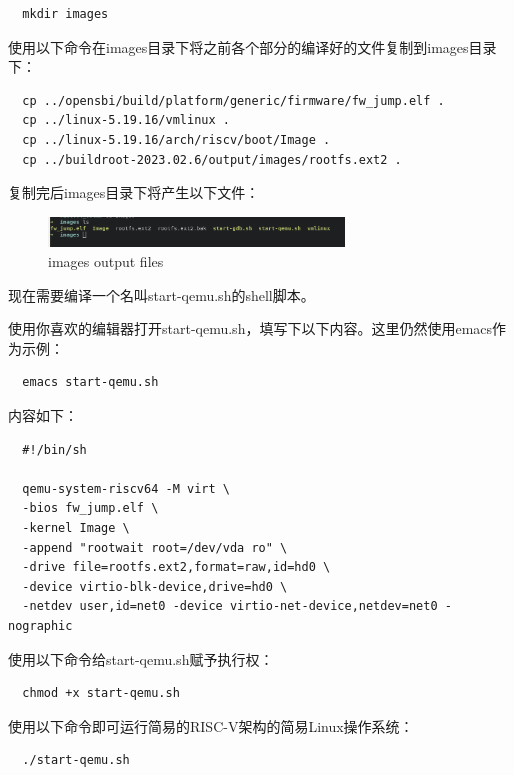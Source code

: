 \documentclass[lang=cn,10pt]{elegantbook}
\begin{document}
\begin{lstlisting}
  mkdir images
\end{lstlisting}

使用以下命令在images目录下将之前各个部分的编译好的文件复制到images目录下：

\begin{lstlisting}
  cp ../opensbi/build/platform/generic/firmware/fw_jump.elf .
  cp ../linux-5.19.16/vmlinux .
  cp ../linux-5.19.16/arch/riscv/boot/Image .
  cp ../buildroot-2023.02.6/output/images/rootfs.ext2 .
\end{lstlisting}

复制完后images目录下将产生以下文件：


\begin{figure}[htbp]
  \centering
  \includegraphics[width=0.7\textwidth]{image/image-20231105102806931.png}
  \caption{images output files}
\end{figure}

现在需要编译一个名叫start-qemu.sh的shell脚本。

使用你喜欢的编辑器打开start-qemu.sh，填写下以下内容。这里仍然使用emacs作为示例：

\begin{lstlisting}
  emacs start-qemu.sh
\end{lstlisting}

内容如下：


\begin{lstlisting}
  #!/bin/sh

  qemu-system-riscv64 -M virt \
  -bios fw_jump.elf \
  -kernel Image \
  -append "rootwait root=/dev/vda ro" \
  -drive file=rootfs.ext2,format=raw,id=hd0 \
  -device virtio-blk-device,drive=hd0 \
  -netdev user,id=net0 -device virtio-net-device,netdev=net0 -nographic
\end{lstlisting}

使用以下命令给start-qemu.sh赋予执行权：

\begin{lstlisting}
  chmod +x start-qemu.sh
\end{lstlisting}

使用以下命令即可运行简易的RISC-V架构的简易Linux操作系统：

\begin{lstlisting}
  ./start-qemu.sh
\end{lstlisting}
\end{document}
